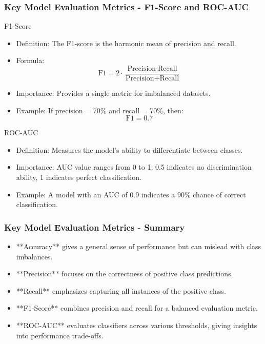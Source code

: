 \documentclass[aspectratio=169]{beamer}
\begin{document}
\begin{frame}[fragile]
    \frametitle{Key Model Evaluation Metrics - F1-Score and ROC-AUC}
    \begin{block}{F1-Score}
        \begin{itemize}
            \item Definition: The F1-score is the harmonic mean of precision and recall.
            \item Formula:
            \begin{equation}
                \text{F1} = 2 \cdot \frac{\text{Precision} \cdot \text{Recall}}{\text{Precision} + \text{Recall}}
            \end{equation}
            \item Importance: Provides a single metric for imbalanced datasets.
            \item Example: If precision = 70\% and recall = 70\%, then:
            \[
            \text{F1} = 0.7
            \]
        \end{itemize}
    \end{block}

    \begin{block}{ROC-AUC}
        \begin{itemize}
            \item Definition: Measures the model's ability to differentiate between classes.
            \item Importance: AUC value ranges from 0 to 1; 0.5 indicates no discrimination ability, 1 indicates perfect classification.
            \item Example: A model with an AUC of 0.9 indicates a 90\% chance of correct classification.
        \end{itemize}
    \end{block}
\end{frame}

\begin{frame}[fragile]
    \frametitle{Key Model Evaluation Metrics - Summary}
    \begin{itemize}
        \item **Accuracy** gives a general sense of performance but can mislead with class imbalances.
        \item **Precision** focuses on the correctness of positive class predictions.
        \item **Recall** emphasizes capturing all instances of the positive class.
        \item **F1-Score** combines precision and recall for a balanced evaluation metric.
        \item **ROC-AUC** evaluates classifiers across various thresholds, giving insights into performance trade-offs.
    \end{itemize}
\end{frame}
\end{document}
